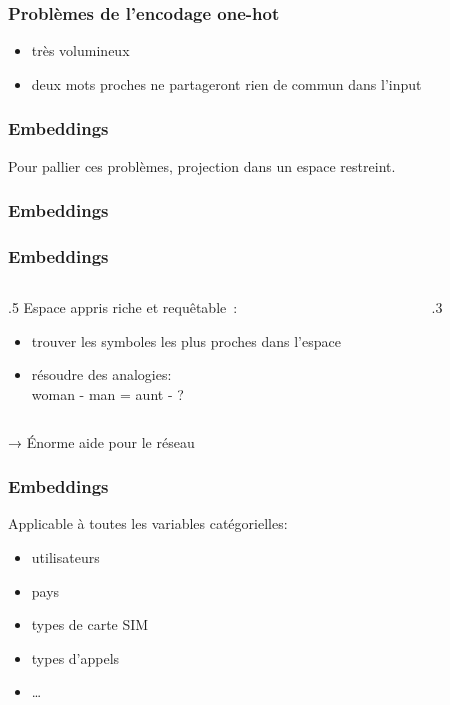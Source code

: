 \documentclass{formation}
\begin{document}
\begin{frame}
  \frametitle{Problèmes de l'encodage one-hot}
  \begin{itemize}
  \item très volumineux
  \item deux mots proches ne partageront rien de commun dans l'input
  \end{itemize}
\end{frame}


\begin{frame}
  \frametitle{Embeddings}
  Pour pallier ces problèmes, projection dans un espace
  restreint.
\end{frame}

\begin{frame}
  \frametitle{Embeddings}
\end{frame}

\begin{frame}
  \frametitle{Embeddings}

  \begin{columns}
    \begin{column}{.5\tw}
      Espace appris riche et requêtable :

      \begin{itemize}
      \item trouver les symboles les plus proches dans l'espace
      \item résoudre des analogies:\\
        woman - man = aunt - ?
      \end{itemize}
    \end{column}
    \begin{column}{.3\tw}
    \end{column}
  \end{columns}

  → Énorme aide pour le réseau
\end{frame}

\begin{frame}
  \frametitle{Embeddings}

  Applicable à toutes les variables catégorielles:

  \begin{itemize}[<+->]
  \item utilisateurs
  \item pays
  \item types de carte SIM
  \item types d'appels
  \item …
  \end{itemize}

\end{frame}
\end{document}
